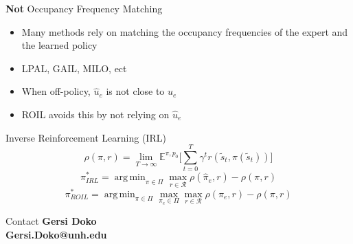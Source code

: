 \documentclass[final,a0paper]{beamer}
\DeclareMathOperator*{\argmin}{arg\,min}
\begin{document}
\begin{frame}{}
\begin{columns}[t]
\begin{column}{0.3\linewidth}
    \begin{block}{\textbf{Not} Occupancy Frequency Matching}
        \begin{itemize}
            \item Many methods rely on matching the occupancy frequencies of the expert and the learned policy
            \item LPAL, GAIL, MILO, ect
            \item When off-policy, $\hat{u}_e$ is not close to $u_e$
            \item ROIL avoids this by not relying on $\hat{u}_e$
        \end{itemize}
    \end{block}

    \begin{block}{Inverse Reinforcement Learning (IRL)}
        \[
          \rho(\pi, r) = \lim_{T \to \infty} \mathbb{E}^{\pi, p_0} \lbrack \sum_{t=0}^{T} \gamma^t r(\tilde{s}_t, \pi(\tilde{s}_t)) \rbrack
        \]
        \[ 
          \pi^*_{IRL} = \argmin_{\pi \in \Pi} \max_{r \in \mathcal{R}} \rho(\hat{\pi}_e, r) - \rho(\pi, r)
        \]
        \[
          \pi^*_{ROIL} = \argmin_{\pi \in \Pi} \max_{\pi_e \in \Pi} \max_{r \in \mathcal{R}} \rho(\pi_e, r) - \rho(\pi, r)
        \]
    \end{block}

    \begin{block}{Contact}
        \textbf{Gersi Doko}\\
        \textbf{Gersi.Doko@unh.edu}
    \end{block}

  \end{column}
  

\end{columns}
\end{frame}
\end{document}

